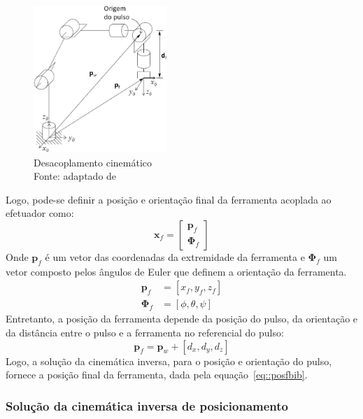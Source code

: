 \begin{figure}[h]
	\centering 
 	\includegraphics[width=0.45\textwidth]{figs/decoupling}
 	\caption[Desacoplamento cinemático]{Desacoplamento cinemático \\ Fonte:
 	adaptado de~\cite{spong2006robot}}
 	\label{fig::decoupling}
\end{figure}

Logo, pode-se definir a posição e orientação final da ferramenta acoplada ao
efetuador como:
%
\begin{equation}
	\mathbf{x}_{f} = \begin{bmatrix}
		\mathbf{p}_{f} \\ \boldsymbol{\Phi}_{f}
	\end{bmatrix}
	\label{eq::posf}	
\end{equation}
%
Onde $\mathbf{p}_{f}$ é um vetor das coordenadas da extremidade da ferramenta e
$\boldsymbol{\Phi}_{f}$ um vetor composto pelos ângulos de Euler que definem a
orientação da ferramenta.
%
\begin{align}
\mathbf{p}_{f} &= [x_f,y_f,z_f] \\
\boldsymbol{\Phi}_{f} &= [\phi,\theta,\psi]
\end{align}
%
Entretanto, a posição da ferramenta depende da posição do pulso, da orientação
e da distância entre o pulso e a ferramenta no referencial do pulso:
% 
\begin{equation} \label{eq::posfbib}
	\mathbf{p}_{f} = \mathbf{p}_{w} + [d_{x}, d_{y}, d_{z}]
\end{equation}
%
Logo, a solução da cinemática inversa, para o posição e orientação do pulso,
fornece a posição final da ferramenta, dada pela equação~\ref{eq::posfbib}.


\subsubsection{Solução da cinemática inversa de posicionamento}

